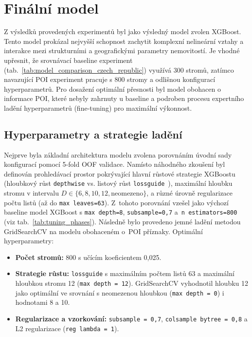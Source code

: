 \section{Finální model}

Z výsledků provedených experimentů byl jako výsledný model zvolen XGBoost. Tento model prokázal nejvyšší schopnost zachytit komplexní nelineární vztahy a interakce mezi strukturními a geografickými parametry nemovitostí. Je vhodné upřesnit, že srovnávací baseline experiment (tab.~\ref{tab:model_comparison_czech_republic}) využívá 300 stromů, zatímco navazující POI experiment pracuje s 800 stromy a odlišnou konfigurací hyperparametrů. Pro dosažení optimální přesnosti byl model obohacen o informace POI, které nebyly zahrnuty u baseline a podroben procesu expertního ladění hyperparametrů (fine-tuning) pro maximální výkonnost.

\subsection{Hyperparametry a strategie ladění}
Nejprve byla základní architektura modelu zvolena porovnáním úvodní sady konfigurací pomocí 5-fold OOF validace. Namísto náhodného zkoušení byl definován prohledávací prostor pokrývající hlavní růstové strategie XGBoostu (hloubkový růst \texttt{depthwise} vs. listový růst \texttt{lossguide}~\cite{ChenGuestrin2016XGBoost}), maximální hloubku stromu v intervalu \(D \in \{6, 8, 10, 12, \text{neomezeno}\}\), a různé úrovně regularizace počtu listů (až do \texttt{max leaves=63}). Z~tohoto porovnání vzešel jako výchozí baseline model XGBoost s \texttt{max depth=8}, \texttt{subsample=0{,}7} a~\texttt{n estimators=800} (viz tab.~\ref{tab:tuning_phases}). Následně bylo provedeno jemné ladění metodou GridSearchCV na modelu obohaceném o~POI příznaky. Optimální hyperparametry:

\begin{itemize}
    \item \textbf{Počet stromů:} 800 s učícím koeficientem 0,025.
    \item \textbf{Strategie růstu:} \texttt{lossguide} s maximálním počtem listů 63 a maximální hloubkou stromu 12 (\texttt{max depth~=~12}). GridSearchCV vyhodnotil hloubku 12 jako optimální ve srovnání s neomezenou hloubkou (\texttt{max depth~=~0}) i hodnotami 8 a 10.
    \item \textbf{Regularizace a vzorkování:} \texttt{subsample~=~0,7}, \texttt{colsample bytree~=~0,8} a L2 regularizace (\texttt{reg lambda~=~1}).
\end{itemize}

